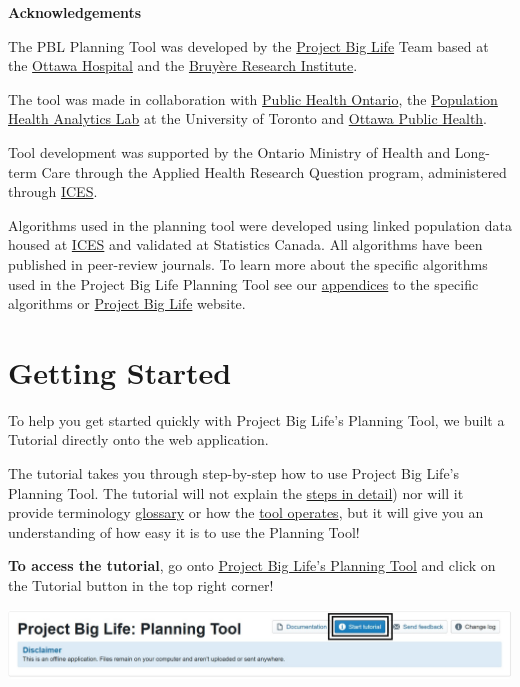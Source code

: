 \documentclass[]{book}
\begin{document}
\textbf{Acknowledgements}

The PBL Planning Tool was developed by the \href{https://www.projectbiglife.ca}{Project Big Life} Team based at the \href{http://www.ohri.ca/home.asp}{Ottawa Hospital} and the \href{https://www.bruyere.org/en/bruyere-research-institute}{Bruyère Research Institute}.

The tool was made in collaboration with \href{https://www.publichealthontario.ca/}{Public Health Ontario}, the \href{https://pophealthanalytics.com/}{Population Health Analytics Lab} at the University of Toronto and \href{http://www.ottawapublichealth.ca/en/index.aspx}{Ottawa Public Health}.

Tool development was supported by the Ontario Ministry of Health and Long-term Care through the Applied Health Research Question program, administered through \href{https://www.ICES.on.ca}{ICES}.

Algorithms used in the planning tool were developed using linked population data housed at \href{https://www.ices.on.ca/}{ICES} and validated at Statistics Canada. All algorithms have been published in peer-review journals. To learn more about the specific algorithms used in the Project Big Life Planning Tool see our \protect\hyperlink{mport}{appendices} to the specific algorithms or \href{https://www.projectbiglife.ca/science}{Project Big Life} website.

\hypertarget{getting-started}{%
\chapter{Getting Started}\label{getting-started}}

To help you get started quickly with Project Big Life's Planning Tool, we built a Tutorial directly onto the web application.

The tutorial takes you through step-by-step how to use Project Big Life's Planning Tool. The tutorial will not explain the \protect\hyperlink{howto}{steps in detail}) nor will it provide terminology \protect\hyperlink{glossary}{glossary} or how the \protect\hyperlink{mport}{tool operates}, but it will give you an understanding of how easy it is to use the Planning Tool!

\textbf{To access the tutorial}, go onto \href{http://planning.projectbiglife.ca/}{Project Big Life's Planning Tool} and click on the Tutorial button in the top right corner!

\begin{center}\includegraphics{Images/Tutorial Button} \end{center}
\end{document}
